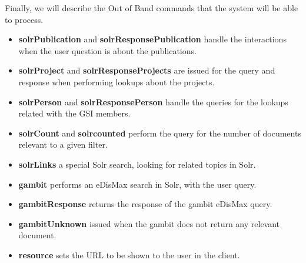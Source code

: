 Finally, we will describe the Out of Band commands that the system will be able to process.

\begin{itemize}
 \item \textbf{solrPublication} and \textbf{solrResponsePublication} handle the interactions when the user question is about the publications.
 \item \textbf{solrProject} and \textbf{solrResponseProjects} are issued for the query and response when performing lookups about the projects.
 \item \textbf{solrPerson} and \textbf{solrResponsePerson} handle the queries for the lookups related with the GSI members.
 \item \textbf{solrCount} and \textbf{solrcounted} perform the query for the number of documents relevant to a given filter.
 \item \textbf{solrLinks} a special Solr search, looking for related topics in Solr. 
 \item \textbf{gambit} performs an \ac{eDisMax} search in Solr, with the user query.
 \item \textbf{gambitResponse} returns the response of the gambit \ac{eDisMax} query.
 \item \textbf{gambitUnknown} issued when the gambit does not return any relevant document.
 \item \textbf{resource} sets the URL to be shown to the user in the client.
\end{itemize}

